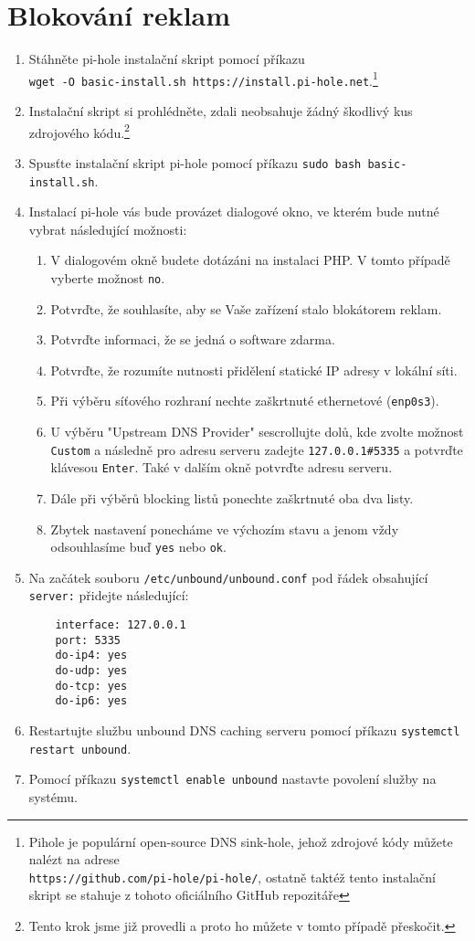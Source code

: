 \section{Blokování reklam}
\begin{enumerate}
	\item Stáhněte pi-hole instalační skript pomocí příkazu\\ \texttt{wget -O basic-install.sh https://install.pi-hole.net}.\footnote{Pihole je populární open-source DNS sink-hole, jehož zdrojové kódy můžete nalézt na adrese\\
	\texttt{https://github.com/pi-hole/pi-hole/}, ostatně taktéž tento instalační skript se stahuje z tohoto oficiálního GitHub repozitáře}
	\item Instalační skript si prohlédněte, zdali neobsahuje žádný škodlivý kus zdrojového kódu.\footnote{Tento krok jsme již provedli a proto ho můžete v tomto případě přeskočit.}
	\item Spusťte instalační skript pi-hole pomocí příkazu \texttt{sudo bash basic-install.sh}.
    \item Instalací pi-hole vás bude provázet dialogové okno, ve kterém bude nutné vybrat následující možnosti:
    \begin{enumerate}
        \item V dialogovém okně budete dotázáni na instalaci PHP. V tomto případě vyberte možnost \texttt{no}.
		\item Potvrďte, že souhlasíte, aby se Vaše zařízení stalo blokátorem reklam.
		\item Potvrďte informaci, že se jedná o software zdarma.
		\item Potvrďte, že rozumíte nutnosti přidělení statické IP adresy v lokální síti.
        \item Při výběru síťového rozhraní nechte zaškrtnuté ethernetové (\texttt{enp0s3}).
        \item U výběru "Upstream DNS Provider" sescrollujte dolů, kde zvolte možnost \texttt{Custom} a následně pro adresu serveru zadejte \texttt{127.0.0.1\#5335} a potvrďte klávesou \texttt{Enter}. Také v dalším okně potvrďte adresu serveru.
        \item Dále při výběrů blocking listů ponechte zaškrtnuté oba dva listy.
        \item Zbytek nastavení ponecháme ve výchozím stavu a jenom vždy odsouhlasíme buď \texttt{yes} nebo \texttt{ok}.
    \end{enumerate}
    \item Na začátek souboru \texttt{/etc/unbound/unbound.conf} pod řádek obsahující \texttt{server:} přidejte následující:
\begin{verbatim}
    interface: 127.0.0.1
    port: 5335
    do-ip4: yes
    do-udp: yes
    do-tcp: yes
    do-ip6: yes
\end{verbatim}
    \item Restartujte službu unbound DNS caching serveru pomocí příkazu \texttt{systemctl restart unbound}.
    \item Pomocí příkazu \texttt{systemctl enable unbound} nastavte povolení služby na systému.
	

\end{enumerate}
